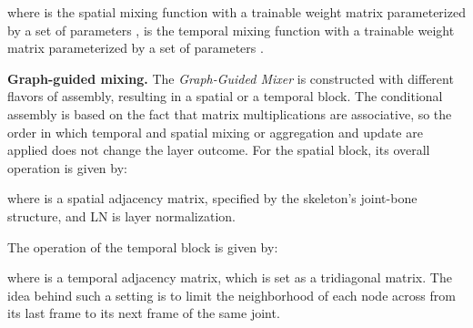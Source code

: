 \documentclass[10pt,twocolumn,letterpaper]{article}
\begin{document}
where  is the spatial mixing function with a trainable weight matrix  parameterized by a set of parameters ,  is the temporal mixing function with a trainable weight matrix  parameterized by a set of parameters .


\noindent\textbf{Graph-guided mixing.}
The \textit{Graph-Guided Mixer} is constructed with different flavors of assembly, resulting in a spatial or a temporal block.
The conditional assembly is based on the fact that matrix multiplications are associative, so the order in which temporal and spatial mixing or aggregation and update are applied does not change the layer outcome.
For the spatial block, its overall operation  is given by:

where  is a spatial adjacency matrix, specified by the skeleton's joint-bone structure, and LN is layer normalization.

The operation of the temporal block  is given by:

where  is a temporal adjacency matrix, which is set as a tridiagonal matrix. The idea behind such a setting is to limit the neighborhood of each node across from its last frame to its next frame of the same joint.
\end{document}
